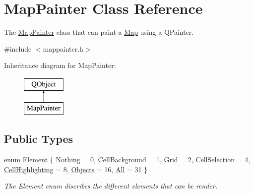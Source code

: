 \hypertarget{class_map_painter}{}\section{Map\+Painter Class Reference}
\label{class_map_painter}


The \hyperlink{class_map_painter}{Map\+Painter} class that can paint a \hyperlink{class_map}{Map} using a Q\+Painter.  




{\ttfamily \#include $<$mappainter.\+h$>$}

Inheritance diagram for Map\+Painter\+:\begin{figure}[H]
\begin{center}
\leavevmode
\includegraphics[height=2.000000cm]{class_map_painter}
\end{center}
\end{figure}
\subsection*{Public Types}
\begin{DoxyCompactItemize}
\item 
enum \hyperlink{class_map_painter_a771b3fa246b6c13cc2acbdcf1cb6eee3}{Element} \{ \newline
\hyperlink{class_map_painter_a771b3fa246b6c13cc2acbdcf1cb6eee3a3a60732dd05f5a7cfbb3f823ed15a8af}{Nothing} = 0, 
\hyperlink{class_map_painter_a771b3fa246b6c13cc2acbdcf1cb6eee3a26b2d5d6e85f1b419545f806e7e5cda2}{Cell\+Background} = 1, 
\hyperlink{class_map_painter_a771b3fa246b6c13cc2acbdcf1cb6eee3a2dcffdfb3d5b1bacc2c5c88cc3642b6a}{Grid} = 2, 
\hyperlink{class_map_painter_a771b3fa246b6c13cc2acbdcf1cb6eee3ac4845e6f97ed778c87dec34258ee0290}{Cell\+Selection} = 4, 
\newline
\hyperlink{class_map_painter_a771b3fa246b6c13cc2acbdcf1cb6eee3a35af0e126a8ff632d0d46c5162ec9a60}{Cell\+Highlighting} = 8, 
\hyperlink{class_map_painter_a771b3fa246b6c13cc2acbdcf1cb6eee3a11b1008cd0aafe904943c1a11cb50ad6}{Objects} = 16, 
\hyperlink{class_map_painter_a771b3fa246b6c13cc2acbdcf1cb6eee3a25561a3666e5fd539263be7c6e9ab063}{All} = 31
 \}\begin{DoxyCompactList}\small\item\em The Element enum discribes the different elements that can be render. \end{DoxyCompactList}
\end{DoxyCompactItemize}
